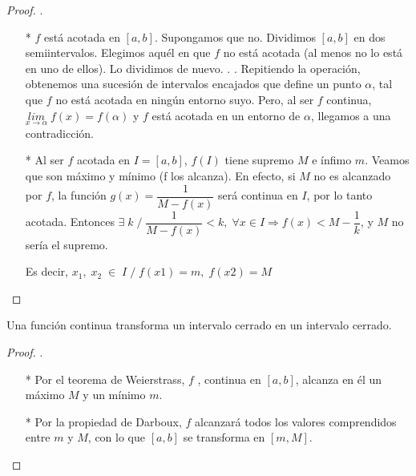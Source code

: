 	\begin{proof}.
		
	\begin{itemize} 
	
	
	\item [*] $f$ está acotada en $[a, b]$. Supongamos que no. Dividimos $[a, b]$ en dos semiintervalos. Elegimos aquél en que $f$ no está acotada (al menos no lo está en uno de ellos). Lo dividimos de nuevo. . . Repitiendo la operación, obtenemos una sucesión de intervalos encajados que define un punto $\alpha$, tal que $f$ no está acotada en ningún entorno suyo. Pero, al ser $f$ continua, $\underset {x\to \alpha }{lim}\;{f(x)} = f(\alpha)$ y $f$ está acotada en un entorno de  $\alpha$, llegamos a una contradicción.
	
	\item [*] Al ser $f$ acotada en $I = [a, b]$, $f(I)$ tiene supremo $M$ e ínfimo $m$. Veamos que son máximo y mínimo (f los alcanza). En efecto, si $M$ no es alcanzado por $f$, la función $g(x) = \dfrac {1}{M - f(x)}$ será continua en $I$, por lo tanto acotada. Entonces $\exists \; k \; / \;  \dfrac {1}{M-f(x)} < k, \; \forall x \in I \Rightarrow  f(x) < M  - \dfrac 1 k$, y $M$ no sería el supremo. 
	
		Es decir, $x_1,\; x_2 \; \in \;  I \; /\;  f(x1) = m,\;  f(x2) = M $
		
	\end{itemize}

 
 	\end{proof}
 	
	\begin{coro}
 		Una función continua transforma un intervalo cerrado en un intervalo cerrado.
 	\end{coro}
 	
 	\begin{proof}.
 	
 	
 	\begin{itemize}
 		
 	
 	
 	 \item [*] Por el teorema de Weierstrass, $f$ , continua en $[a, b]$, alcanza en él un máximo $M$ y un mínimo $m$.
 	
 	 \item [*] Por la propiedad de Darboux, $f$ alcanzará todos los valores comprendidos entre $m$ y $M$, con lo que $[a, b]$ se transforma en $[m, M]$.
 	 
 	 \end{itemize}
 
 
 	\end{proof}
	
